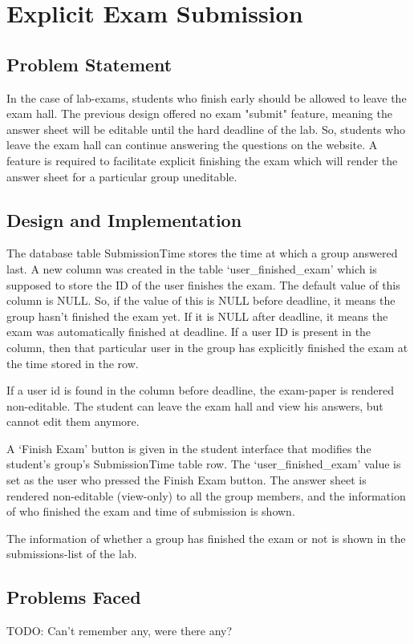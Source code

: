\section{Explicit Exam Submission}

\subsection{Problem Statement}
In the case of lab-exams, students who finish early should be allowed to leave the exam hall. The previous design offered no exam "submit" feature, meaning the answer sheet will be editable until the hard deadline of the lab. So, students who leave the exam hall can continue answering the questions on the website. A feature is required to facilitate explicit finishing the exam which will render the answer sheet for a particular group uneditable.

\subsection{Design and Implementation}
The database table SubmissionTime stores the time at which a group answered last. A new column was created in the table `user\_finished\_exam' which is supposed to store the ID of the user finishes the exam. The default value of this column is NULL. So, if the value of this is NULL before deadline, it means the group hasn't finished the exam yet. If it is NULL after deadline, it means the exam was automatically finished at deadline. If a user ID is present in the column, then that particular user in the group has explicitly finished the exam at the time stored in the row.

If a user id is found in the column before deadline, the exam-paper is rendered non-editable. The student can leave the exam hall and view his answers, but cannot edit them anymore.

A `Finish Exam' button is given in the student interface that modifies the student's group's SubmissionTime table row. The `user\_finished\_exam' value is set as the user who pressed the Finish Exam button. The answer sheet is rendered non-editable (view-only) to all the group members, and the information of who finished the exam and time of submission is shown.

The information of whether a group has finished the exam or not is shown in the submissions-list of the lab.

\subsection{Problems Faced}
TODO: Can't remember any, were there any?
